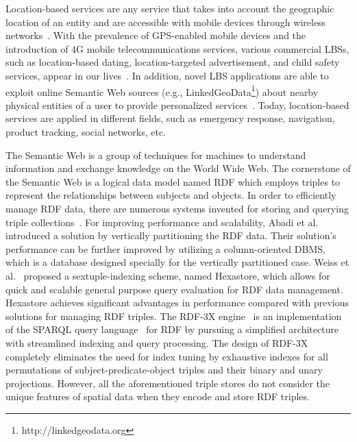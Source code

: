 
Location-based services are any service that takes into account
the geographic location of an entity and are accessible with
mobile devices through wireless
networks~\cite{journals/cacm/JunglasW08}. With the prevalence of
GPS-enabled mobile devices and the introduction of 4G mobile
telecommunications services, various commercial LBSs, such as
location-based dating, location-targeted advertisement, and child
safety services, appear in our
lives~\cite{journals/pervasive/BellavistaKH08}. In addition, novel
LBS applications are able to exploit online Semantic Web sources
(e.g., LinkedGeoData\footnote{http://linkedgeodata.org}) about
nearby physical entities of a user to provide personalized
services~\cite{journals/internet/WoenselCPT11}. Today,
location-based services are applied in different fields, such as
emergency response, navigation, product tracking, social networks,
etc.



The Semantic Web is a group of techniques for machines to
understand information and exchange knowledge on the World Wide
Web. The cornerstone of the Semantic Web is a logical data model
named RDF which employs triples to represent the relationships
between subjects and objects. In order to efficiently manage RDF
data, there are numerous systems invented for storing and querying
triple
collections~\cite{conf/www/CarrollDDRSW04,conf/vldb/ChongDES05,conf/vldb/AbadiMMH07,
journals/pvldb/WeissKB08,journals/vldb/NeumannW10}. For improving
performance and scalability, Abadi et
al.~\cite{conf/vldb/AbadiMMH07} introduced a solution by
vertically partitioning the RDF data. Their solution's performance
can be further improved by utilizing a column-oriented DBMS, which
is a database designed specially for the vertically partitioned
case. Weiss et al.~\cite{journals/pvldb/WeissKB08} proposed a
sextuple-indexing scheme, named Hexastore, which allows for quick
and scalable general purpose query evaluation for RDF data
management. Hexastore achieves significant advantages in
performance compared with previous solutions for managing RDF
triples. The RDF-3X engine~\cite{journals/vldb/NeumannW10} is an
implementation of the SPARQL query language~\cite{SPARQL} for RDF
by pursuing a simplified architecture with streamlined indexing
and query processing. The design of RDF-3X completely eliminates
the need for index tuning by exhaustive indexes for all
permutations of subject-predicate-object triples and their binary
and unary projections. However, all the aforementioned triple
stores do not consider the unique features of spatial data when
they encode and store RDF triples.

